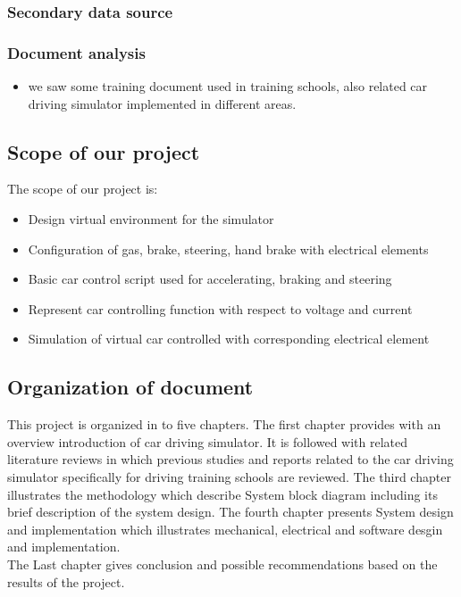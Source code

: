 \documentclass[12pt,a4paper]{article}
\begin{document}
\subsubsection{Secondary data source}
\subsubsection*{Document analysis}
\begin{itemize}
	\item 
	we saw some training document used in training schools, also related car driving simulator implemented in different areas.
\end{itemize}
\subsection{Scope of our project}
The scope of our project is:
\begin{itemize}
		\item 
	Design virtual environment for the simulator
	\item 
	Configuration of gas, brake, steering, hand brake with electrical elements
	\item 
	Basic car control script used for accelerating, braking and steering
	\item 
	Represent car controlling function with respect to voltage and current
	\item 
	Simulation of virtual car controlled with corresponding electrical element

	
\end{itemize}
\subsection{Organization of document}
This project is organized in to five chapters.
The first chapter provides with an overview introduction of car driving simulator. It is followed with related literature reviews in which previous studies and reports related to the car driving simulator specifically for driving training schools are reviewed. The third chapter illustrates the methodology which describe System block diagram including its brief description of the system design. The fourth chapter presents System design and implementation which illustrates mechanical, electrical and software desgin and implementation. 
\\The Last chapter gives conclusion and possible recommendations based on the results of the project. 
\end{document}
